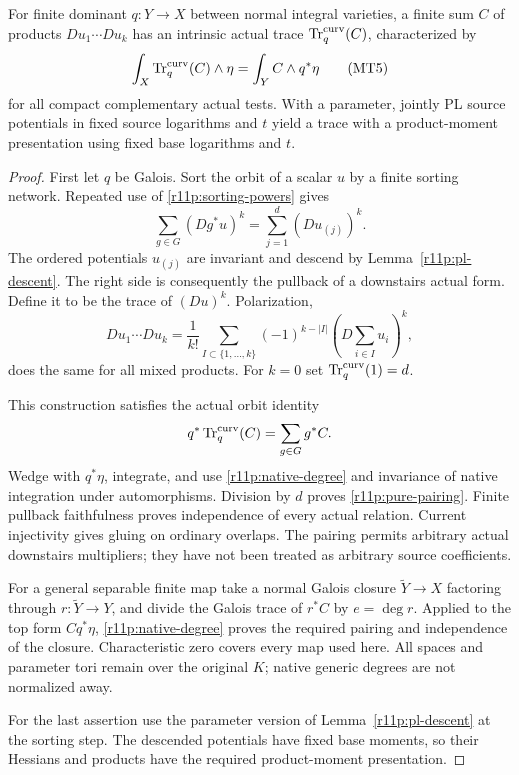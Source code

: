 \begin{lemma}
\label{r11p:pure-trace}
For finite dominant $q:Y\to X$ between normal integral varieties, a
finite sum $C$ of products $Du_1\cdots Du_k$ has an intrinsic actual
trace $\operatorname{Tr}^{\rm curv}_q(C)$, characterized by
\[
 \int_X\operatorname{Tr}^{\rm curv}_q(C)\wedge\eta
                         =\int_YC\wedge q^*\eta
\tag{MT5}\label{r11p:pure-pairing}
\]
for all compact complementary actual tests.  With a parameter, jointly
PL source potentials in fixed source logarithms and $t$ yield a trace
with a product-moment presentation using fixed base logarithms and $t$.
\end{lemma}

\begin{proof}
First let $q$ be Galois.  Sort the orbit of a scalar $u$ by a finite
sorting network.  Repeated use of \eqref{r11p:sorting-powers} gives
\[
                     \sum_{g\in G}(Dg^*u)^k
                            =\sum_{j=1}^d(Du_{(j)})^k.
\]
The ordered potentials $u_{(j)}$ are invariant and descend by
Lemma~\ref{r11p:pl-descent}.  The right side is consequently the
pullback of a downstairs actual form.  Define it to be the trace of
$(Du)^k$.  Polarization,
\[
 Du_1\cdots Du_k
   =\frac1{k!}\sum_{I\subset\{1,\ldots,k\}}
           (-1)^{k-|I|}\left(D\sum_{i\in I}u_i\right)^k,
\]
does the same for all mixed products.  For $k=0$ set
$\operatorname{Tr}^{\rm curv}_q(1)=d$.

This construction satisfies the actual orbit identity
\[
                 q^*\operatorname{Tr}^{\rm curv}_q(C)
                                      =\sum_{g\in G}g^*C.
\]
Wedge with $q^*\eta$, integrate, and use
\eqref{r11p:native-degree} and invariance of native integration under
automorphisms.  Division by $d$ proves \eqref{r11p:pure-pairing}.
Finite pullback faithfulness proves independence of every actual
relation.  Current injectivity gives gluing on ordinary overlaps.
The pairing permits arbitrary actual downstairs multipliers; they
have not been treated as arbitrary source coefficients.

For a general separable finite map take a normal Galois closure
$\widetilde Y\to X$ factoring through $r:\widetilde Y\to Y$, and divide
the Galois trace of $r^*C$ by $e=\deg r$.  Applied to the top form
$Cq^*\eta$, \eqref{r11p:native-degree} proves the required pairing and
independence of the closure.  Characteristic zero covers every map
used here.  All spaces and parameter tori remain over the original
$K$; native generic degrees are not normalized away.

For the last assertion use the parameter version of
Lemma~\ref{r11p:pl-descent} at the sorting step.  The descended
potentials have fixed base moments, so their Hessians and products
have the required product-moment presentation.
\end{proof}


